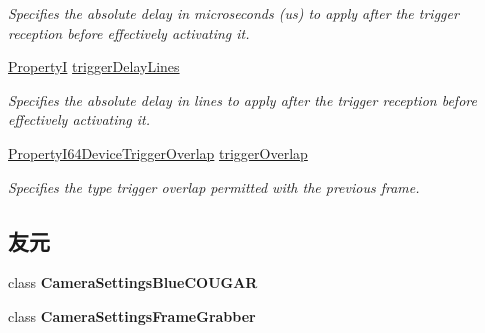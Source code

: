 \begin{DoxyCompactItemize}
\begin{DoxyCompactList}\small\item\em Specifies the absolute delay in microseconds (us) to apply after the trigger reception before effectively activating it. \end{DoxyCompactList}\item 
\hypertarget{classmv_i_m_p_a_c_t_1_1acquire_1_1_trigger_control_a88f288f7c8c4ee71402366f8a8a24d19}{\hyperlink{group___common_interface_ga12d5e434238ca242a1ba4c6c3ea45780}{Property\+I} \hyperlink{classmv_i_m_p_a_c_t_1_1acquire_1_1_trigger_control_a88f288f7c8c4ee71402366f8a8a24d19}{trigger\+Delay\+Lines}}\label{classmv_i_m_p_a_c_t_1_1acquire_1_1_trigger_control_a88f288f7c8c4ee71402366f8a8a24d19}

\begin{DoxyCompactList}\small\item\em Specifies the absolute delay in lines to apply after the trigger reception before effectively activating it. \end{DoxyCompactList}\item 
\hyperlink{group___common_interface_ga2fc921dda59fa054dbcb02f41ba4d423}{Property\+I64\+Device\+Trigger\+Overlap} \hyperlink{classmv_i_m_p_a_c_t_1_1acquire_1_1_trigger_control_a14e6151f6e6f0b3da896e0bfc0226855}{trigger\+Overlap}
\begin{DoxyCompactList}\small\item\em Specifies the type trigger overlap permitted with the previous frame. \end{DoxyCompactList}\end{DoxyCompactItemize}
\subsection*{友元}
\begin{DoxyCompactItemize}
\item 
\hypertarget{classmv_i_m_p_a_c_t_1_1acquire_1_1_trigger_control_abb8b34d4826a4241462f6682dead7323}{class {\bfseries Camera\+Settings\+Blue\+C\+O\+U\+G\+A\+R}}\label{classmv_i_m_p_a_c_t_1_1acquire_1_1_trigger_control_abb8b34d4826a4241462f6682dead7323}

\item 
\hypertarget{classmv_i_m_p_a_c_t_1_1acquire_1_1_trigger_control_acf0753e6a362e1c4375e1ef090c077f9}{class {\bfseries Camera\+Settings\+Frame\+Grabber}}\label{classmv_i_m_p_a_c_t_1_1acquire_1_1_trigger_control_acf0753e6a362e1c4375e1ef090c077f9}

\end{DoxyCompactItemize}
